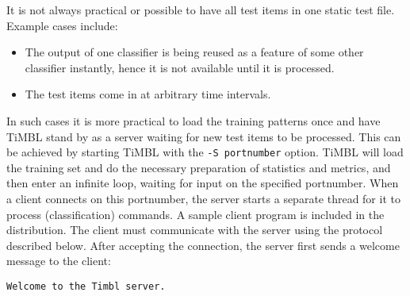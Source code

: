\documentclass{report}
\begin{document}
It is not always practical or possible to have all test items in one
static test file. Example cases include:

\begin{itemize}
\item The output of one classifier is being reused as a feature of
some other classifier instantly, hence it is not available until it is
processed.
\item The test items come in at arbitrary time intervals.
\end{itemize}

In such cases it is more practical to load the training patterns once
and have TiMBL stand by as a server waiting for new test items to be
processed. This can be achieved by starting TiMBL with the {\tt -S
portnumber} option. TiMBL will load the training set and do the
necessary preparation of statistics and metrics, and then enter an
infinite loop, waiting for input on the specified portnumber. When a
client connects on this portnumber, the server starts a separate
thread for it to process (classification) commands. A sample client
program is included in the distribution. The client must communicate
with the server using the protocol described below. After accepting
the connection, the server first sends a welcome message to the client:

{\tt Welcome to the Timbl server.}
\end{document}
